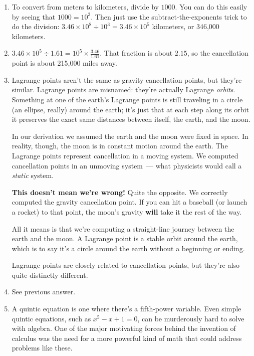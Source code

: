\documentclass[10pt,letterpaper]{report}
\begin{document}
  \begin{enumerate}
  \item
    To convert from meters to kilometers, divide by $1000$.  You can
    do this easily by seeing that $1000 = 10^3$.  Then just use the
    subtract-the-exponents trick to do the division: $3.46 \times 10^8
    \div 10^3 = 3.46 \times 10^5$ kilometers, or 346,000 kilometers.
  \item
    $3.46 \times 10^5 \div 1.61 = 10^5 \times \frac{3.46}{1.61}$.
    That fraction is about $2.15$, so the cancellation point is about
    215,000 miles away.
  \item
    Lagrange points aren't the same as gravity cancellation points,
    but they're similar.  Lagrange points are misnamed: they're
    actually Lagrange \textit{orbits}.  Something at one of the
    earth's Lagrange points is still traveling in a
    circle (an ellipse, really) around the earth; it's just that at
    each step along its orbit it preserves the exact same distances
    between itself, the earth, and the moon.

    In our derivation we assumed the earth and the moon were fixed in
    space.  In reality, though, the moon is in constant motion around
    the earth.  The Lagrange points represent cancellation in a moving
    system.  We computed cancellation points in an unmoving
    \mbox{system ---} what physicists would call a \textit{static}
    system.

    \textbf{This doesn't mean we're wrong!}  Quite the opposite.  We
    correctly computed the gravity cancellation point.  If you can hit
    a baseball (or launch a rocket) to that point, the moon's gravity
    \textbf{will} take it the rest of the way.

    All it means is that we're computing a straight-line journey
    between the earth and the moon.  A Lagrange point is a stable
    orbit around the earth, which is to say it's a circle around the
    earth without a beginning or ending.

    Lagrange points are closely related to cancellation points, but
    they're also quite distinctly different.
  \item
    See previous answer.
  \item
    A quintic equation is one where there's a fifth-power variable.
    Even simple quintic equations, such as $x^5 - x + 1 = 0$, can be
    murderously hard to solve with algebra.  One of the major
    motivating forces behind the invention of calculus was the need
    for a more powerful kind of math that could address problems like
    these.
  \end{enumerate}
\end{document}
